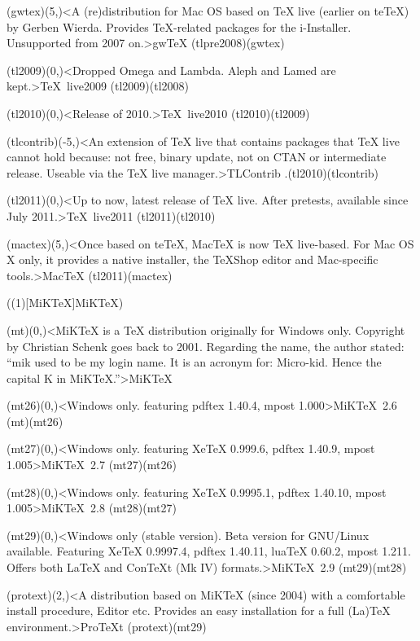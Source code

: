 {	\tonode[\histdistro](gwtex)(5,\layer)<A (re)distribution for Mac OS based on TeX live (earlier on teTeX) by Gerben Wierda. Provides TeX-related packages for the i-Installer. Unsupported from 2007 on.>{gw\TeX}
	\todraw(tlpre2008)(gwtex)

	\steplayer

	\tonode(tl2009)(0,\layer)<Dropped Omega and Lambda. Aleph and Lamed are kept.>{\TeX\ live2009}
	\todraw(tl2009)(tl2008)
	\steplayer

	\tonode(tl2010)(0,\layer)<Release of 2010.>{\TeX\ live2010}
	\todraw(tl2010)(tl2009)

	\tonode(tlcontrib)(-5,\layer)<An extension of TeX live that contains packages that TeX live cannot hold because: not free, binary update, not on CTAN or intermediate release. Useable via the TeX live manager.>{TLContrib}
	\todraw.(tl2010)(tlcontrib)
	\steplayer

	\tonode(tl2011)(0,\layer)<Up to now, latest release of TeX live. After pretests, available since July 2011.>{\TeX\ live2011}
	\todraw(tl2011)(tl2010)

	\tonode(mactex)(5,\layer)<Once based on teTeX, MacTeX is now TeX live-based. For Mac OS X only, it provides a native installer, the TeXShop editor and Mac-specific tools.>{Mac\TeX}
	\todraw(tl2011)(mactex)
}

\tograph(\tostruct(1)[MiK\TeX]{MiK\TeX}){
	\tonode(mt)(0,\layer)<MiKTeX is a TeX distribution originally for Windows only. Copyright by Christian Schenk goes back to 2001. Regarding the name, the author stated: “mik used to be my login name. It is an acronym for: Micro-kid. Hence the capital K in MiKTeX.”>{MiK\TeX}
	\steplayer

	\tonode(mt26)(0,\layer)<Windows only. featuring  pdftex 1.40.4, mpost 1.000>{MiK\TeX\ 2.6}
	\todraw(mt)(mt26)
	\steplayer

	\tonode(mt27)(0,\layer)<Windows only. featuring  XeTeX 0.999.6, pdftex 1.40.9, mpost 1.005>{MiK\TeX\ 2.7}
	\todraw(mt27)(mt26)
	\steplayer

	\tonode(mt28)(0,\layer)<Windows only. featuring  XeTeX 0.9995.1, pdftex 1.40.10, mpost 1.005>{MiK\TeX\ 2.8}
	\todraw(mt28)(mt27)
	\steplayer

	\tonode(mt29)(0,\layer)<Windows only (stable version). Beta version for GNU/Linux available. Featuring XeTeX 0.9997.4, pdftex 1.40.11, luaTeX 0.60.2, mpost 1.211. Offers both LaTeX and ConTeXt (Mk IV) formats.>{MiK\TeX\ 2.9}
	\todraw(mt29)(mt28)
	\steplayer	
	
	\tonode(protext)(2,\layer)<A distribution based on MiKTeX (since 2004) with a comfortable install procedure, Editor etc. Provides an easy installation for a full (La)TeX environment.>{ProTeXt}
	\todraw(protext)(mt29)
}

